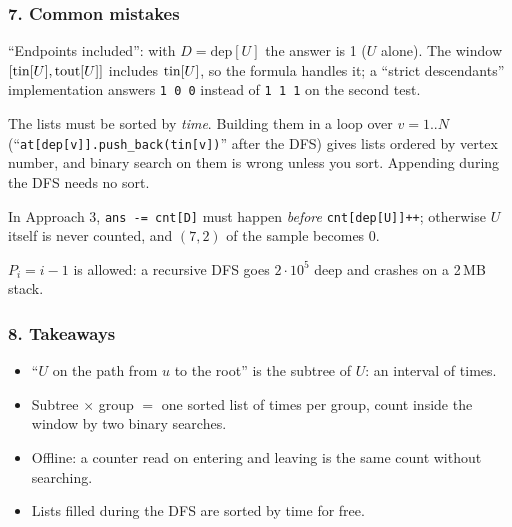 \subsubsection*{7. Common mistakes}

\begin{warningbox}
``Endpoints included'': with $D = \mathrm{dep}[U]$ the answer is 1 ($U$ alone). The window $[\mathrm{tin}[U], \mathrm{tout}[U]]$ includes $\mathrm{tin}[U]$, so the formula handles it; a ``strict descendants'' implementation answers \texttt{1 0 0} instead of \texttt{1 1 1} on the second test.
\end{warningbox}

\begin{warningbox}
The lists must be sorted by \emph{time}. Building them in a loop over $v = 1..N$ (``\texttt{at[dep[v]].push\_back(tin[v])}'' after the DFS) gives lists ordered by vertex number, and binary search on them is wrong unless you sort. Appending during the DFS needs no sort.
\end{warningbox}

\begin{warningbox}
In Approach 3, \texttt{ans -= cnt[D]} must happen \emph{before} \texttt{cnt[dep[U]]++}; otherwise $U$ itself is never counted, and $(7, 2)$ of the sample becomes 0.
\end{warningbox}

\begin{warningbox}
$P_i = i - 1$ is allowed: a recursive DFS goes $2\cdot10^5$ deep and crashes on a 2\,MB stack.
\end{warningbox}

\subsubsection*{8. Takeaways}

\begin{itemize}[leftmargin=*]
    \item ``$U$ on the path from $u$ to the root'' is the subtree of $U$: an interval of times.
    \item Subtree $\times$ group $=$ one sorted list of times per group, count inside the window by two binary searches.
    \item Offline: a counter read on entering and leaving is the same count without searching.
    \item Lists filled during the DFS are sorted by time for free.
\end{itemize}

